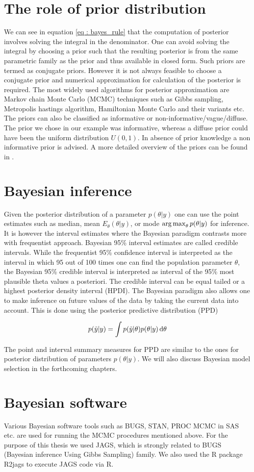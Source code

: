 \section{The role of prior distribution}
We can see in equation \ref{eq : bayes_rule} that the computation of posterior involves solving the integral in the denominator. One can avoid solving the integral by choosing a prior such that the resulting posterior is from the same parametric family as the prior and thus available in closed form. Such priors are termed as conjugate priors. However it is not always feasible to choose a conjugate prior and numerical approximation for calculation of the posterior is required. The most widely used algorithms for posterior approximation are Markov chain Monte Carlo (MCMC) techniques such as Gibbs sampling, Metropolis hastings algorithm, Hamiltonian Monte Carlo and their variants etc. The priors can also be classified as informative or non-informative/vague/diffuse. The prior we chose in our example was informative, whereas a diffuse prior could have been the uniform distribution $U(0,1)$. In absence of prior knowledge a non informative prior is advised. A more detailed overview of the priors can be found in \citet{lesaffre_bayesian_2012}.

\section{Bayesian inference}
Given the posterior distribution of a parameter $p(\theta|y)$ one can use the point estimates such as median, mean $E_\theta(\theta|y)$, or mode $\operatorname*{arg\,max}_\theta p(\theta|y)$ for inference. It is however the interval estimates where the Bayesian paradigm contrasts more with frequentist approach. Bayesian 95\% interval estimates are called credible intervals. While the frequentist 95\% confidence interval is interpreted as the interval in which 95 out of 100 times one can find the population parameter $\theta$, the Bayesian 95\% credible interval is interpreted as interval of the 95\% most plausible theta values a posteriori. The credible interval can be equal tailed or a highest posterior density interval (HPDI). The Bayesian paradigm also allows one to make inference on future values of the data by taking the current data into account. This is done using the posterior predictive distribution (PPD)

$$p(\tilde{y}|y) = \int p(\tilde{y}|\theta) p(\theta|y) \mathop{}\!\mathrm{d}\theta$$

The point and interval summary measures for PPD are similar to the ones for posterior distribution of parameters $p(\theta|y)$. We will also discuss Bayesian model selection in the forthcoming chapters.

\section{Bayesian software}
Various Bayesian software tools such as BUGS, STAN, PROC MCMC in SAS etc. are used for running the MCMC procedures mentioned above. For the purpose of this thesis we used JAGS, which is strongly related to BUGS (Bayesian inference Using Gibbs Sampling) family. We also used the R package R2jags to execute JAGS code via R.